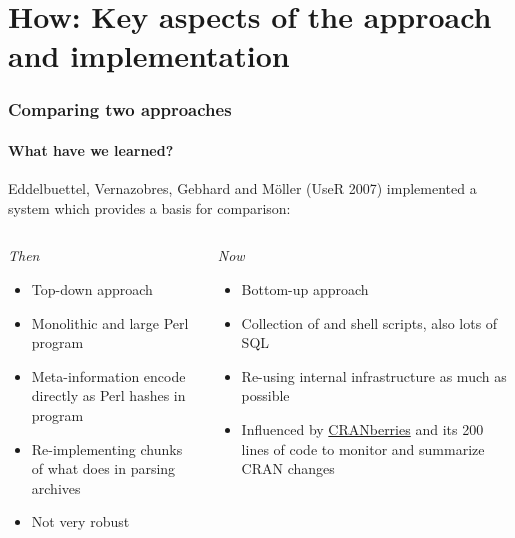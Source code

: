 \documentclass[smaller,compress]{beamer}
\begin{document}
\section[How]{How: Key aspects of the approach and implementation}
\begin{frame}
  \frametitle{Comparing two approaches}
  \framesubtitle{What have we learned?}

  Eddelbuettel, Vernazobres, Gebhard and M\"{o}ller (UseR 2007) implemented a
  system which provides a basis for comparison:

  \MedSkip

  \begin{columns}
    \begin{column}{2in}
      \textsl{Then}
      \begin{itemize}
      \item Top-down approach 
      \item Monolithic and large Perl program 
      \item Meta-information encode directly as Perl hashes in program
      \item Re-implementing chunks of what \R does in parsing archives
      \item Not very robust
      \end{itemize}
    \end{column}      

    \begin{column}{2in}
      \textsl{Now}
      \begin{itemize}
      \item Bottom-up approach
      \item Collection of \R and shell scripts, also lots of SQL
      \item Re-using \R internal infrastructure as much as possible
      \item Influenced by %
        \href{http://dirk.eddelbuettel.com/cranberries/}{CRANberries} and its
        200 lines of \R code to monitor and summarize CRAN changes
      \end{itemize}
    \end{column}      
  \end{columns}
\end{frame}
\end{document}
